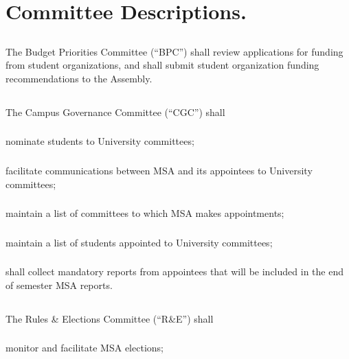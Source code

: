 \article{}

\section{Committee Descriptions.}

\subsection{}
The Budget Priorities Committee (``BPC'') shall review applications for funding from student organizations, and shall submit student organization funding recommendations to the Assembly.

\subsection{}
The Campus Governance Committee (``CGC'') shall
\subsubsection{}
nominate students to University committees;
\subsubsection{}
facilitate communications between MSA and its appointees to University committees;
\subsubsection{}
maintain a list of committees to which MSA makes appointments;
\subsubsection{}
maintain a list of students appointed to University committees;
\subsubsection{}
shall collect mandatory reports from appointees that will be included in the end of semester MSA reports.


\subsection{}
The Rules \& Elections Committee (``R\&E'') shall
\subsubsection{}
monitor and facilitate MSA elections;
